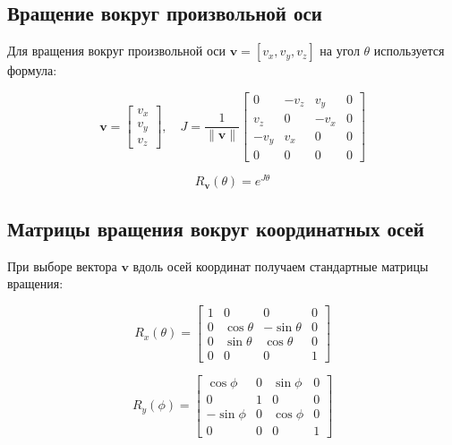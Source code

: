 \subsection*{Вращение вокруг произвольной оси}

Для вращения вокруг произвольной оси $\mathbf{v} = [v_x, v_y, v_z]$ на угол $\theta$ используется формула:

\begin{equation}
\mathbf{v} = \begin{bmatrix} v_x \\ v_y \\ v_z \end{bmatrix}, \quad
J = \frac{1}{\|\mathbf{v}\|} \begin{bmatrix}
0 & -v_z & v_y & 0 \\
v_z & 0 & -v_x & 0 \\
-v_y & v_x & 0 & 0 \\
0 & 0 & 0 & 0
\end{bmatrix}
\end{equation}

\begin{equation}
R_{\mathbf{v}}(\theta) = e^{J\theta}
\end{equation}

\subsection*{Матрицы вращения вокруг координатных осей}

При выборе вектора $\mathbf{v}$ вдоль осей координат получаем стандартные матрицы вращения:

\begin{equation}
R_x(\theta) = \begin{bmatrix}
1 & 0 & 0 & 0 \\
0 & \cos\theta & -\sin\theta & 0 \\
0 & \sin\theta & \cos\theta & 0 \\
0 & 0 & 0 & 1
\end{bmatrix}
\end{equation}

\begin{equation}
R_y(\phi) = \begin{bmatrix}
\cos\phi & 0 & \sin\phi & 0 \\
0 & 1 & 0 & 0 \\
-\sin\phi & 0 & \cos\phi & 0 \\
0 & 0 & 0 & 1
\end{bmatrix}
\end{equation}

